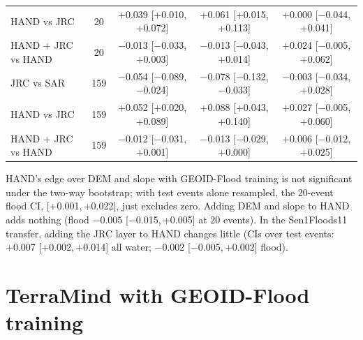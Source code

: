 \documentclass[journal,onecolumn]{IEEEtran}
\newcommand{\ci}[2]{[#1,\,#2]}
\begin{document}
\begin{table}[H]
{\begin{tabular}{@{}lcccc@{}}
HAND vs JRC & 20 & +0.039 [+0.010, +0.072] & +0.061 [+0.015, +0.113] & +0.000 [−0.044, +0.041] \\
HAND + JRC vs HAND & 20 & −0.013 [−0.033, +0.003] & −0.013 [−0.043, +0.014] & +0.024 [−0.005, +0.062] \\
JRC vs SAR & 159 & −0.054 [−0.089, −0.024] & −0.078 [−0.132, −0.033] & −0.003 [−0.034, +0.028] \\
HAND vs JRC & 159 & +0.052 [+0.020, +0.089] & +0.088 [+0.043, +0.140] & +0.027 [−0.005, +0.060] \\
HAND + JRC vs HAND & 159 & −0.012 [−0.031, +0.001] & −0.013 [−0.029, +0.000] & +0.006 [−0.012, +0.025] \\
\bottomrule
\end{tabular}}
\end{table}

HAND's edge over DEM and slope with GEOID-Flood training is not significant under the two-way bootstrap;
with test events alone resampled, the 20-event flood CI, \ci{+0.001}{+0.022}, just excludes zero. Adding
DEM and slope to HAND adds nothing (flood −0.005 \ci{−0.015}{+0.005} at 20 events). In the Sen1Floods11
transfer, adding the JRC layer to HAND changes little (CIs over test events: +0.007 \ci{+0.002}{+0.014} all water; −0.002
\ci{−0.005}{+0.002} flood).

\section*{TerraMind with GEOID-Flood training}

\begin{table}[H]
\caption{TerraMind (TM) and U-Net, ± HAND, with GEOID-Flood training (unseen activations, event-mean IoU,
two-way 95\% CIs; number of improved events where given).}
\centering
{}
\end{table}
\end{document}
